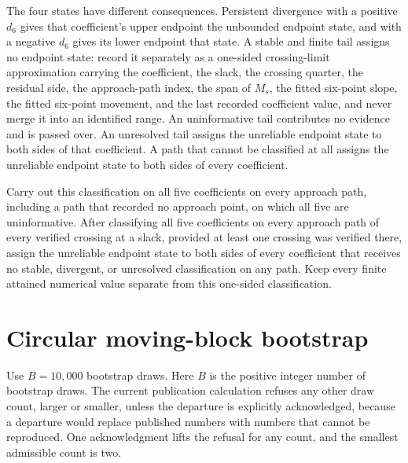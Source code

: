 \documentclass[11pt]{article}
\begin{document}
The four states have different consequences. Persistent divergence with a positive \(d_6\) gives that
coefficient's upper endpoint the unbounded endpoint state, and with a negative \(d_6\) gives its lower
endpoint that state. A stable and finite tail assigns no endpoint state: record it separately as a
one-sided crossing-limit approximation carrying the coefficient, the slack, the crossing quarter, the
residual side, the approach-path index, the span of \(M_s\), the fitted six-point slope, the fitted six-point movement, and the last recorded coefficient value, and never merge it into an identified
range. An uninformative tail contributes no evidence and is passed over. An unresolved tail assigns
the unreliable endpoint state to both sides of that coefficient. A path that cannot be classified at
all assigns the unreliable endpoint state to both sides of every coefficient.

Carry out this classification on all five coefficients on every approach path, including a path that
recorded no approach point, on which all five are uninformative. After classifying all five
coefficients on every approach path of every verified crossing at a slack, provided at least one
crossing was verified there, assign the unreliable endpoint state to both sides of every coefficient that receives no
stable, divergent, or unresolved classification on any path. Keep every finite attained
numerical value separate from this one-sided classification.

\section{Circular moving-block bootstrap}
\label{sec:bootstrap}

Use \(B=10{,}000\) bootstrap draws. Here \(B\) is the positive integer number of bootstrap draws.
The current publication calculation refuses any other draw count, larger or smaller, unless the
departure is explicitly acknowledged, because a departure would replace published numbers with
numbers that cannot be reproduced. One acknowledgment lifts the refusal for any count, and the
smallest admissible count is two.
\end{document}
